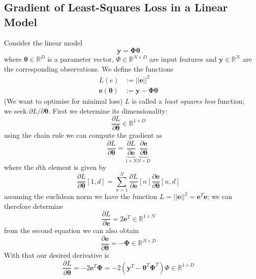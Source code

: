 \documentclass{report}
\begin{document}
\subsection{Gradient of Least-Squares Loss in a Linear Model}
Consider the linear model
\begin{equation*}
\bm{y}=\bm{\Phi\theta}
\end{equation*}
where $\bm{\theta}\in\mathbb{R}^D$ is a parameter vector, $\Phi\in\mathbb{R}^{N\times D}$ are input features and $\bm{y}
\in\mathbb{R}^N$ are the corresponding observations. We define the functions
\begin{align*}
L(e)&:=||\bm{e}||^2\\
\bm{e}(\bm{\theta})&:=\bm{y}-\bm{\Phi\theta}
\end{align*}
(We want to optimise for minimal loss) $L$ is called a \textit{least squares loss} function; 
we seek $\partial L/\partial\bm{\theta}$. First we determine its dimensionality:
\begin{equation*}
\frac{\partial L}{\partial\bm{\theta}}\in\mathbb{R}^{1\times D}
\end{equation*}
using the chain rule we can compute the gradient as
\begin{equation*}
\frac{\partial L}{\partial\bm{\theta}}=\underbrace{\frac{\partial L}{\partial\bm{e}}}_{1\times N}
\underbrace{\frac{\partial{\bm{e}}}{\partial\bm{\theta}}}_{N\times D}
\end{equation*}
where the $d$th element is given by
\begin{equation*}
\frac{\partial L}{\partial\bm{\theta}}[1,d]=
\sum^N_{n=1}\frac{\partial L}{\partial\bm{e}}[n]\frac{\partial{\bm{e}}}{\partial\bm{\theta}}[n,d]
\end{equation*}
assuming the euclidean norm we have the function $L=||\bm{e}||^2=\bm{e}^T\bm{e}$; we can therefore determine
\begin{equation*}
\frac{\partial L}{\partial\bm{e}}=2\bm{e}^T\in\mathbb{R}^{1\times N}
\end{equation*}
from the second equation we can also obtain
\begin{equation*}
\frac{\partial\bm{e}}{\partial\bm{\theta}}=-\bm{\Phi}\in\mathbb{R}^{N\times D}
\end{equation*}
With that our desired derivative is
\begin{equation*}
\frac{\partial L}{\partial\bm{\theta}}=-2\bm{e}^T\bm{\Phi}=
-2(\bm{y}^T-\bm{\theta}^T\bm{\Phi}^T)\Phi\in\mathbb{R}^{1\times D}
\end{equation*}
\newpage
\end{document}
